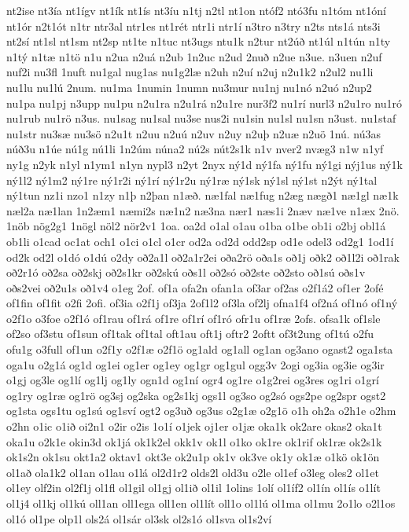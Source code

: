 {nt2ise
nt3ía
nt1ígv
nt1ík
nt1ís
nt3íu
n1tj
n2tl
nt1on
ntóf2
ntó3fu
n1tóm
nt1óní
nt1ór
n2t1ót
n1tr
ntr3al
ntr1es
nt1rét
ntr1i
ntr1í
n3tro
n3try
n2ts
nts1á
nts3i
nt2sí
nt1sl
nt1sm
nt2sp
nt1te
n1tuc
nt3ugs
ntu1k
n2tur
nt2úð
nt1úl
n1tún
n1ty
n1tý
n1tæ
n1tö
n1u
n2ua
n2uá
n2ub
1n2uc
n2ud
2nuð
n2ue
n3ue.
n3uen
n2uf
nuf2i
nu3fl
1nuft
nu1gal
nug1as
nu1g2læ
n2uh
n2uí
n2uj
n2u1k2
n2ul2
nu1li
nu1lu
nu1lú
2num.
nu1ma
1numin
1numn
nu3mur
nu1nj
nu1nó
n2uó
n2up2
nu1pa
nu1pj
n3upp
nu1pu
n2u1ra
n2u1rá
n2u1re
nur3f2
nu1rí
nurl3
n2u1ro
nu1ró
nu1rub
nu1rö
n3us.
nu1sag
nu1sal
nu3se
nus2i
nu1sin
nu1sl
nu1sn
n3ust.
nu1staf
nu1str
nu3sæ
nu3sö
n2u1t
n2uu
n2uú
n2uv
n2uy
n2uþ
n2uæ
n2uö
1nú.
nú3as
núð3u
n1úe
nú1g
nú1li
1n2úm
núna2
nú2s
nút2s1k
n1v
nver2
nvæg3
n1w
n1yf
ny1g
n2yk
n1yl
n1ym1
n1yn
nypl3
n2yt
2nyx
ný1d
ný1fa
ný1fu
ný1gi
nýj1us
ný1k
ný1l2
ný1m2
ný1re
ný1r2i
ný1rí
ný1r2u
ný1ræ
ný1sk
ný1sl
ný1st
n2ýt
ný1tal
ný1tun
nz1i
nzo1
n1zy
n1þ
n2þan
n1æð.
næ1fal
næ1fug
n2æg
nægð1
næ1gl
næ1k
næl2a
næ1lan
1n2æm1
næmi2s
næ1n2
næ3na
nær1
næs1i
2næv
næ1ve
n1æx
2nö.
1nöb
nög2g1
1nögl
nöl2
nör2v1
1oa.
oa2d
o1al
o1au
o1ba
o1be
ob1i
o2bj
obl1á
ob1li
o1cad
oc1at
och1
o1ci
o1cl
o1cr
od2a
od2d
odd2sp
od1e
odel3
od2g1
1od1í
od2k
od2l
o1dó
o1dú
o2dy
oð2a1l
oð2a1r2ei
oða2rö
oða1s
oð1j
oðk2
oð1l2i
oð1rak
oð2r1ó
oð2sa
oð2skj
oð2s1kr
oð2skú
oðs1l
oð2só
oð2ste
oð2sto
oð1sú
oðs1v
oðs2vei
oð2u1s
oð1v4
o1eg
2of.
of1a
ofa2n
ofan1a
of3ar
of2as
o2f1á2
of1er
2ofé
of1fin
of1fit
o2fi
2ofi.
of3ia
o2f1j
of3ja
2of1l2
of3la
of2lj
ofna1f4
of2ná
of1nó
of1ný
o2f1o
o3foe
o2f1ó
of1rau
of1rá
of1re
of1rí
of1ró
ofr1u
of1ræ
2ofs.
ofsa1k
of1sle
of2so
of3stu
of1sun
of1tak
of1tal
oft1au
oft1j
oftr2
2oftt
of3t2ung
of1tú
o2fu
ofu1g
o3full
of1un
o2f1y
o2f1æ
o2f1ö
og1ald
og1all
og1an
og3ano
ogast2
oga1sta
oga1u
o2g1á
og1d
og1ei
og1er
og1ey
og1gr
og1gul
ogg3v
2ogi
og3ia
og3ie
og3ir
o1gj
og3le
og1lí
og1lj
og1ly
ogn1d
og1ní
ogr4
og1re
o1g2rei
og3res
og1ri
o1grí
og1ry
og1ræ
og1rö
og3sj
og2ska
og2s1kj
ogs1l
og3so
og2só
ogs2pe
og2spr
ogst2
og1sta
ogs1tu
og1sú
og1sví
ogt2
og3uð
og3us
o2g1æ
o2g1ö
o1h
oh2a
o2h1e
o2hm
o2hn
o1ic
o1ið
oi2n1
o2ir
o2is
1o1í
o1jek
oj1er
o1jæ
oka1k
ok2are
okas2
oka1t
oka1u
o2k1e
okin3d
ok1já
ok1k2el
okk1v
ok1l
o1ko
ok1re
ok1rif
ok1ræ
ok2s1k
ok1s2n
ok1su
okt1a2
oktav1
okt3e
ok2u1p
ok1v
ok3ve
ok1y
ok1æ
o1kö
ok1ön
ol1að
ola1k2
ol1an
o1lau
o1lá
ol2d1r2
olds2l
old3u
o2le
ol1ef
o3leg
oles2
ol1et
ol1ey
olf2in
ol2f1j
ol1fl
ol1gil
ol1gj
ol1ið
ol1il
1olins
1olí
ol1íf2
ol1ín
ol1ís
o1lít
ol1j4
ol1kj
ol1kú
oll1an
oll1ega
oll1en
ol1lít
oll1o
ol1lú
ol1ma
ol1mu
2o1lo
o2l1os
ol1ó
ol1pe
olp1l
ols2á
ol1sár
ol3sk
ol2s1ó
ol1sva
ol1s2ví
}
